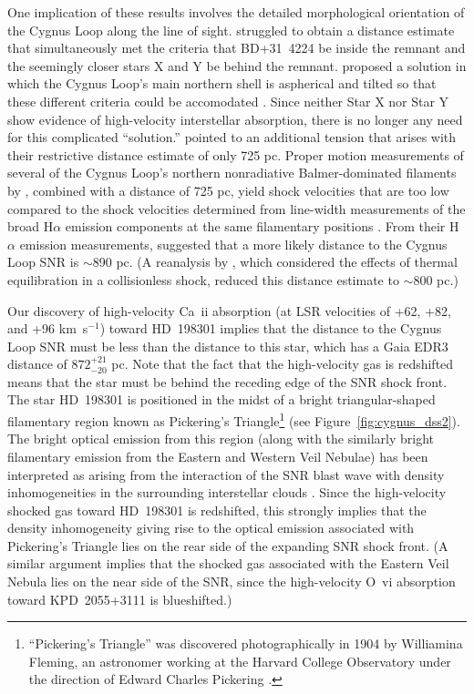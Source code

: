 \documentclass[fleqn,usenatbib]{mnras}
\begin{document}
One implication of these results involves the detailed morphological orientation of the Cygnus Loop along the line of sight. \citet{f18b} struggled to obtain a distance estimate that simultaneously met the criteria that BD+31~4224 be inside the remnant and the seemingly closer stars X and Y be behind the remnant. \citet{f18b} proposed a solution in which the Cygnus Loop's main northern shell is aspherical and tilted so that these different criteria could be accomodated \citep[see Figures~4 and 5 in][]{f18b}. Since neither Star X nor Star Y show evidence of high-velocity interstellar absorption, there is no longer any need for this complicated ``solution.'' \citet{f21} pointed to an additional tension that arises with their restrictive distance estimate of only 725 pc. Proper motion measurements of several of the Cygnus Loop's northern nonradiative Balmer-dominated filaments by \citet{s09}, combined with a distance of 725 pc, yield shock velocities that are too low compared to the shock velocities determined from line-width measurements of the broad H$\alpha$ emission components at the same filamentary positions \citep{m14}. From their H$\alpha$ emission measurements, \citet{m14} suggested that a more likely distance to the Cygnus Loop SNR is $\sim$890 pc. (A reanalysis by \citet{r15}, which considered the effects of thermal equilibration in a collisionless shock, reduced this distance estimate to $\sim$800 pc.)

Our discovery of high-velocity Ca~{\sc ii} absorption (at LSR velocities of +62, +82, and +96 km~s$^{-1}$) toward HD~198301 implies that the distance to the Cygnus Loop SNR must be less than the distance to this star, which has a Gaia EDR3 distance of $872^{+21}_{-20}$ pc. Note that the fact that the high-velocity gas is redshifted means that the star must be behind the receding edge of the SNR shock front. The star HD~198301 is positioned in the midst of a bright triangular-shaped filamentary region known as Pickering's Triangle\footnote{``Pickering's Triangle'' was discovered photographically in 1904 by Williamina Fleming, an astronomer working at the Harvard College Observatory under the direction of Edward Charles Pickering \citep[see][]{pf06}.} (see Figure~\ref{fig:cygnus_dss2}). The bright optical emission from this region (along with the similarly bright filamentary emission from the Eastern and Western Veil Nebulae) has been interpreted as arising from the interaction of the SNR blast wave with density inhomogeneities in the surrounding interstellar clouds \citep{l98,f18b}. Since the high-velocity shocked gas toward HD~198301 is redshifted, this strongly implies that the density inhomogeneity giving rise to the optical emission associated with Pickering's Triangle lies on the rear side of the expanding SNR shock front. (A similar argument implies that the shocked gas associated with the Eastern Veil Nebula lies on the near side of the SNR, since the high-velocity O~{\sc vi} absorption toward KPD~2055+3111 is blueshifted.)
\end{document}
